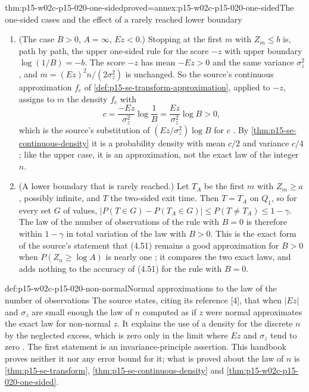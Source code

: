 \begin{hbtheorem}{thm:p15-w02c-p15-020-one-sided}{proved=annex:p15-w02c-p15-020-one-sided}{The one-sided cases and the effect of a rarely reached lower boundary}
\begin{enumerate}
\item (The case \(B>0\), \(A=\infty\), \(Ez<0\).) Stopping at the first
 \(m\) with \(Z_m\leq b\) is, path by path, the upper one-sided rule for
 the score \(-z\) with upper boundary \(\log(1/B)=-b\). The score \(-z\)
 has mean \(-Ez>0\) and the same variance \(\sigma_z^2\), and
 \(m=(Ez)^2n/(2\sigma_z^2)\) is unchanged. So the source's continuous
 approximation \(f_c\) of \cref{def:p15-se-transform-approximation},
 applied to \(-z\), assigns to \(m\) the density \(f_c\) with
 \[
  c=\frac{-Ez}{\sigma_z^2}\log\frac1B=\frac{Ez}{\sigma_z^2}\log B>0,
 \]
 which is the source's substitution of \((Ez/\sigma_z^2)\log B\) for
 \(c\) \cite[Section 4.4, p.~150]{Wald1945SequentialTests}. By
 \cref{thm:p15-se-continuous-density} it is a probability density with
 mean \(c/2\) and variance \(c/4\); like the upper case, it is an
 approximation, not the exact law of the integer \(n\).
\item (A lower boundary that is rarely reached.) Let \(T_A\) be the first
 \(m\) with \(Z_m\geq a\), possibly infinite, and \(T\) the two-sided
 exit time. Then \(T=T_A\) on \(Q_1\), so for every set \(G\) of
 values,
 \(|P(T\in G)-P(T_A\in G)|\leq P(T\neq T_A)\leq1-\gamma\). The law of
 the number of observations of the rule with \(B=0\) is therefore
 within \(1-\gamma\) in total variation of the law with \(B>0\). This
 is the exact form of the source's statement that (4.51) remains a good
 approximation for \(B>0\) when \(P(Z_n\geq\log A)\) is nearly one
 \cite[Section 4.4, p.~151]{Wald1945SequentialTests}; it compares the
 two exact laws, and adds nothing to the accuracy of (4.51) for the
 rule with \(B=0\).
\end{enumerate}
\end{hbtheorem}

\begin{hbwarning}{def:p15-w02c-p15-020-non-normal}{Normal approximations to the law of the number of observations}
The source states, citing its reference [4], that when \(|Ez|\) and
\(\sigma_z\) are small enough the law of \(n\) computed as if \(z\) were
normal approximates the exact law for non-normal \(z\). It explains the
use of a density for the discrete \(n\) by the neglected excess, which
is zero only in the limit where \(Ez\) and \(\sigma_z\) tend to zero
\cite[Section 4.4, p.~151]{Wald1945SequentialTests}. The first statement
is an invariance-principle assertion. This handbook proves neither it
nor any error bound for it; what is proved about the law of \(n\) is
\cref{thm:p15-se-transform}, \cref{thm:p15-se-continuous-density} and
\cref{thm:p15-w02c-p15-020-one-sided}.
\end{hbwarning}

